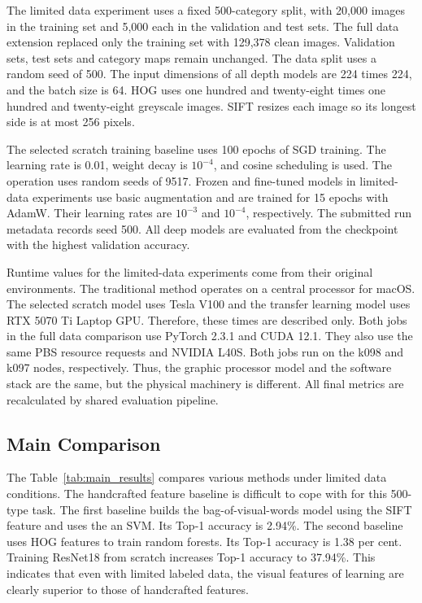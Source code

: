 The limited data experiment uses a fixed 500-category split, with 20,000
images in the training set and 5,000 each in the validation and test sets. The
full data extension replaced only the training set with 129,378 clean images.
Validation sets, test sets and category maps remain unchanged. The data split
uses a random seed of 500. The input dimensions of all depth models are 224
times 224, and the batch size is 64. HOG uses one hundred and twenty-eight
times one hundred and twenty-eight greyscale images. SIFT resizes each image
so its longest side is at most 256 pixels.

The selected scratch training baseline uses 100 epochs of SGD training. The
learning rate is 0.01, weight decay is $10^{-4}$, and cosine scheduling is
used. The operation uses random seeds of 9517. Frozen and fine-tuned models in
limited-data experiments use basic augmentation and are trained for 15 epochs
with AdamW. Their learning rates are $10^{-3}$ and $10^{-4}$, respectively.
The submitted run metadata records seed 500. All deep models are evaluated
from the checkpoint with the highest validation accuracy.

Runtime values for the limited-data experiments come from their original
environments. The traditional method operates on a central processor for
macOS. The selected scratch model uses Tesla V100 and the transfer learning
model uses RTX 5070 Ti Laptop GPU. Therefore, these times are described only.
Both jobs in the full data comparison use PyTorch 2.3.1 and CUDA 12.1. They
also use the same PBS resource requests and NVIDIA L40S. Both jobs run on the
k098 and k097 nodes, respectively. Thus, the graphic processor model and the
software stack are the same, but the physical machinery is different. All
final metrics are recalculated by shared evaluation pipeline.

\subsection{Main Comparison}
\label{sec:main_comparison}

The Table~\ref{tab:main_results} compares various methods under limited data
conditions. The handcrafted feature baseline is difficult to cope with for
this 500-type task. The first baseline builds the bag-of-visual-words model
using the SIFT feature and uses the an SVM. Its Top-1 accuracy is 2.94\%. The
second baseline uses HOG features to train random forests. Its Top-1 accuracy
is 1.38 per cent. Training ResNet18 from scratch increases Top-1 accuracy to
37.94\%. This indicates that even with limited labeled data, the visual
features of learning are clearly superior to those of handcrafted features.

